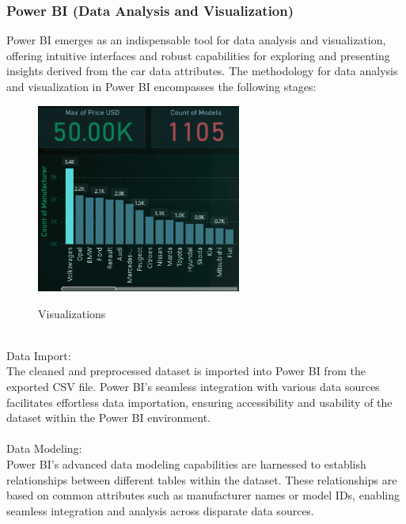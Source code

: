 \documentclass{article}
\begin{document}
{\subsubsection{Power BI (Data Analysis and Visualization)}

Power BI emerges as an indispensable tool for data analysis and visualization, offering intuitive interfaces and robust capabilities for exploring and presenting insights derived from the car data attributes. The methodology for data analysis and visualization in Power BI encompasses the following stages:
\\
\begin{figure}[htbp]
  \centering
  \vspace{0.3cm}
  \includegraphics[width=0.6\textwidth]{Figures/PowerBI/infographics.png}\\
  \caption{Visualizations}
  \vspace{0.3cm}
\end{figure}
\\
Data Import:
\\
The cleaned and preprocessed dataset is imported into Power BI from the exported CSV file. Power BI's seamless integration with various data sources facilitates effortless data importation, ensuring accessibility and usability of the dataset within the Power BI environment.
\\
\\
Data Modeling:
\\
Power BI's advanced data modeling capabilities are harnessed to establish relationships between different tables within the dataset. These relationships are based on common attributes such as manufacturer names or model IDs, enabling seamless integration and analysis across disparate data sources.
\\
\\
}
\end{document}
